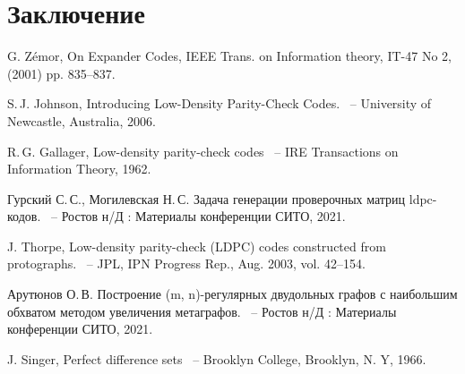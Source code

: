 \documentclass[14pt]{mmcs-article}
\begin{document}
\newpage
{}
\section*{Заключение}



\newpage

\renewcommand{\refname}{\centering \textbf{Литература}}

\begin{thebibliography}{0}

G. Zémor, On Expander Codes, IEEE Trans. on Information theory, IT-47
No 2, (2001) pp. 835–837.
  
S.\,J. Johnson,
Introducing Low-Density Parity-Check Codes.
~-- University of Newcastle, Australia, 2006.

R.\,G. Gallager,
Low-density parity-check codes
~-- IRE Transactions on Information Theory, 1962.

Гурский С.\,С., Могилевская Н.\,С.
Задача генерации проверочных матриц ldpc-кодов.
~-- Ростов н/Д : Материалы конференции СИТО, 2021.

J. Thorpe,
Low-density parity-check (LDPC) codes constructed from protographs.
~-- JPL, IPN Progress Rep., Aug. 2003, vol. 42–154.

Арутюнов О.\,В.
Построение (m, n)-регулярных двудольных графов с наибольшим обхватом методом увеличения метаграфов.
~-- Ростов н/Д : Материалы конференции СИТО, 2021.

J. Singer,
Perfect difference sets
~-- Brooklyn College, Brooklyn, N. Y, 1966.

\end{thebibliography}
\end{document}
